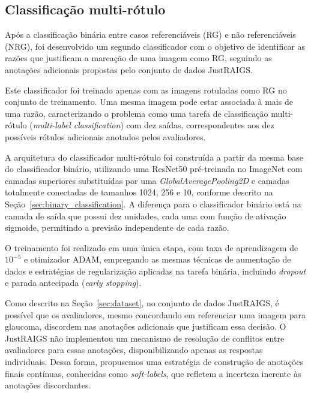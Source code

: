 \documentclass[12pt]{article}
\begin{document}
\subsection{Classificação multi-rótulo}
\label{sec:multi_classification}

Após a classificação binária entre casos referenciáveis (RG) e não referenciáveis (NRG), foi desenvolvido um segundo classificador com o objetivo de identificar as razões que justificam a marcação de uma imagem como RG, seguindo as anotações adicionais propostas pelo conjunto de dados JustRAIGS.

Este classificador foi treinado apenas com as imagens rotuladas como RG no conjunto de treinamento. Uma mesma imagem pode estar associada à mais de uma razão, caracterizando o problema como uma tarefa de classificação multi-rótulo (\emph{multi-label classification}) com dez saídas, correspondentes aos dez possíveis rótulos adicionais anotados pelos avaliadores.

A arquitetura do classificador multi-rótulo foi construída a partir da mesma base do classificador binário, utilizando uma ResNet50 pré-treinada no ImageNet com camadas superiores substituídas por uma \emph{GlobalAveragePooling2D} e camadas totalmente conectadas de tamanhos 1024, 256 e 10, conforme descrito na Seção~\ref{sec:binary_classification}. A diferença para o classificador binário está na camada de saída que possui dez unidades, cada uma com função de ativação sigmoide, permitindo a previsão independente de cada razão.

O treinamento foi realizado em uma única etapa, com taxa de aprendizagem de $10^{-5}$ e otimizador ADAM, empregando as mesmas técnicas de aumentação de dados e estratégias de regularização aplicadas na tarefa binária, incluindo \emph{dropout} e parada antecipada (\emph{early stopping}).

Como descrito na Seção~\ref{sec:dataset}, no conjunto de dados JustRAIGS, é possível que os avaliadores, mesmo concordando em referenciar uma imagem para glaucoma, discordem nas anotações adicionais que justificam essa decisão. O JustRAIGS não implementou um mecanismo de resolução de conflitos entre avaliadores para essas anotações, disponibilizando apenas as respostas individuais. Dessa forma, propusemos uma estratégia de construção de anotações finais contínuas, conhecidas como \emph{soft-labels}, que refletem a incerteza inerente às anotações discordantes.
\end{document}
